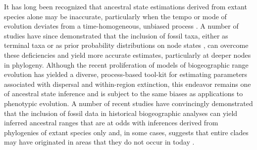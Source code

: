 \documentclass[a4paper, 12pt]{article}
\begin{document}
It has long been recognized that ancestral state estimations derived from extant species alone may be inaccurate, particularly when the tempo or mode of evolution deviates from a time-homogeneous, unbiased process \citep{omland1999assumptions,oakley2000independent,wright2015came}. A number of studies have since demonstrated that the inclusion of fossil taxa, either as terminal taxa \citep{finarelli2006ancestral,albert2009fossils,betancur2012apparent} or as prior probability distributions on node states \citep{slater2012integrating}, can overcome these deficiencies and yield more accurate estimates, particularly at deeper nodes in phylogeny. Although the recent proliferation of models of biogeographic range evolution has yielded a diverse, process-based tool-kit for estimating parameters associated with dispersal and within-region extinction, this endeavor remains one of ancestral state inference and is subject to the same biases as applications to phenotypic evolution. A number of recent studies have convincingly demonstrated that the inclusion of fossil data in historical biogeographic analyses can yield inferred ancestral ranges that are at odds with inferences derived from phylogenies of extant species only and, in some cases, suggests that entire clades may have originated in areas that they do not occur in today \citep{field2018north,gunnell2018fossil,siqueira2019historical,azevedo2021fossils,macaluso2022biogeographic}.
\end{document}
